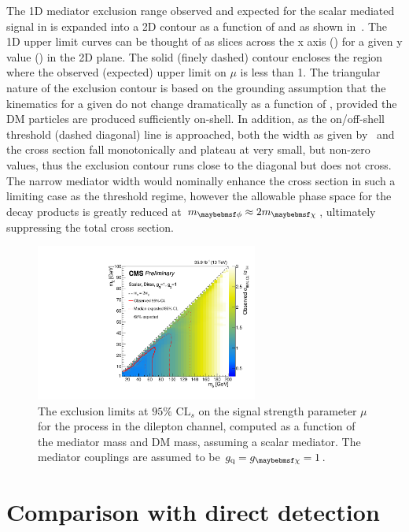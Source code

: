 The 1D mediator exclusion range observed and expected for the scalar mediated \ttDM signal in  is expanded into a 2D contour as a function of \mMed and \mDM as shown in~. The 1D upper limit curves can be thought of as slices across the x axis (\mMed) for a given y value (\mDM) in the 2D plane. The solid (finely dashed) contour encloses the region where the observed (expected) upper limit on $\mu$ is less than 1. The triangular nature of the exclusion contour is based on the grounding assumption that the kinematics for a given \mMed do not change dramatically as a function of \mDM, provided the DM particles are produced sufficiently on-shell. In addition, as the on/off-shell threshold (dashed diagonal) line is approached, both the width as given by~ and the cross section fall monotonically and plateau at very small, but non-zero values, thus the exclusion contour runs close to the diagonal but does not cross. The narrow mediator width would nominally enhance the cross section in such a limiting case as the threshold regime, however the allowable phase space for the decay products is greatly reduced at $\mMed \approx 2\mDM$, ultimately suppressing the total cross section.

\begin{figure}
  \centering
  \includegraphics[width=0.65\textwidth]{figs/dilept_inc_S_limits2D_NLO.pdf}
  \caption{The exclusion limits at $95\%$ $\textrm{CL}_{s}$ on the signal strength parameter $\mu$ for the \ttDM process in the dilepton channel, computed as a function of the mediator mass and DM mass, assuming a scalar mediator. The mediator couplings are assumed to be $\gq=\gDM=1$.}
  \label{fig:2Dexclusion}
\end{figure}

\clearpage 

\section{Comparison with direct detection}
\label{sec:comparetoDD}

